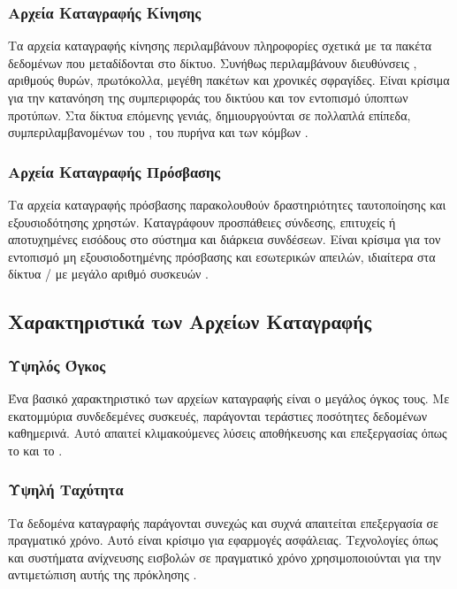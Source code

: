 \subsubsection{Αρχεία Καταγραφής Κίνησης}

Τα αρχεία καταγραφής κίνησης περιλαμβάνουν πληροφορίες σχετικά με τα πακέτα δεδομένων που μεταδίδονται στο δίκτυο. Συνήθως περιλαμβάνουν διευθύνσεις , αριθμούς θυρών, πρωτόκολλα, μεγέθη πακέτων και χρονικές σφραγίδες. Είναι κρίσιμα για την κατανόηση της συμπεριφοράς του δικτύου και τον εντοπισμό ύποπτων προτύπων. Στα δίκτυα επόμενης γενιάς, δημιουργούνται σε πολλαπλά επίπεδα, συμπεριλαμβανομένων του , του πυρήνα και των κόμβων  \cite{garcia2014anomaly}.

\subsubsection{Αρχεία Καταγραφής Πρόσβασης}

Τα αρχεία καταγραφής πρόσβασης παρακολουθούν δραστηριότητες ταυτοποίησης και εξουσιοδότησης χρηστών. Καταγράφουν προσπάθειες σύνδεσης, επιτυχείς ή αποτυχημένες εισόδους στο σύστημα και διάρκεια συνδέσεων. Είναι κρίσιμα για τον εντοπισμό μη εξουσιοδοτημένης πρόσβασης και εσωτερικών απειλών, ιδιαίτερα στα δίκτυα / με μεγάλο αριθμό συσκευών \cite{scarfone2007guide}.

\subsection{Χαρακτηριστικά των Αρχείων Καταγραφής}

\subsubsection{Υψηλός Όγκος}

Ένα βασικό χαρακτηριστικό των αρχείων καταγραφής είναι ο μεγάλος όγκος τους. Με εκατομμύρια συνδεδεμένες συσκευές, παράγονται τεράστιες ποσότητες δεδομένων καθημερινά. Αυτό απαιτεί κλιμακούμενες λύσεις αποθήκευσης και επεξεργασίας όπως το και το  \cite{behl2017cybersecurity}.

\subsubsection{Υψηλή Ταχύτητα}

Τα δεδομένα καταγραφής παράγονται συνεχώς και συχνά απαιτείται επεξεργασία σε πραγματικό χρόνο. Αυτό είναι κρίσιμο για εφαρμογές ασφάλειας. Τεχνολογίες όπως  και συστήματα ανίχνευσης εισβολών σε πραγματικό χρόνο χρησιμοποιούνται για την αντιμετώπιση αυτής της πρόκλησης \cite{chen2014big}.

